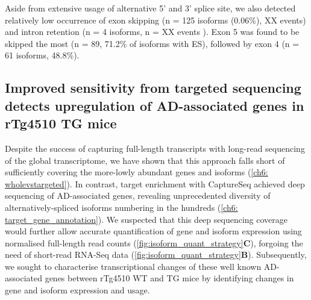 Aside from extensive usage of alternative 5' and 3' splice site, we also detected relatively low occurrence of exon skipping (n = 125 isoforms (0.06\%), XX events) and intron retention (n = 4 isoforms, n = XX events ). Exon 5 was found to be skipped the most (n = 89, 71.2\% of isoforms with ES), followed by exon 4 (n = 61 isoforms, 48.8\%). 

\newpage
\subsection{Improved sensitivity from targeted sequencing detects upregulation of AD-associated genes in rTg4510 TG mice}
Despite the success of capturing full-length transcripts with long-read sequencing of the global transcriptome, we have shown that this approach falls short of sufficiently covering the more-lowly abundant genes and isoforms (\cref{ch6: wholevstargeted}). In contrast, target enrichment with CaptureSeq achieved deep sequencing of AD-associated genes, revealing unprecedented diversity of alternatively-spliced isoforms numbering in the hundreds (\cref{ch6: target_gene_annotation}). We suspected that this deep sequencing coverage would further allow accurate quantification of gene and isoform expression using normalised full-length read counts (\cref{fig:isoform_quant_strategy}\textbf{C}), forgoing the need of short-read RNA-Seq data (\cref{fig:isoform_quant_strategy}\textbf{B}). Subsequently, we sought to characterise transcriptional changes of these well known AD-associated genes between rTg4510 WT and TG mice by identifying changes in gene and isoform expression and usage.

